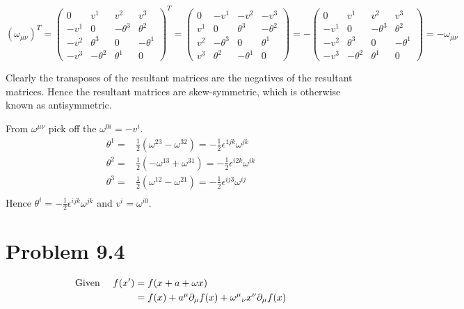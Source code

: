 \documentclass{article}
\begin{document}
\[(\omega_{\mu\nu})^T=\begin{pmatrix}0&v^1&v^2&v^3\\-v^1&0&-\theta^3&\theta^2\\-v^2&\theta^3&0&-\theta^1\\-v^3&-\theta^2&\theta^1&0\end{pmatrix}^T=\begin{pmatrix}0&-v^1&-v^2&-v^3\\v^1&0&\theta^3&-\theta^2\\v^2&-\theta^3&0&\theta^1\\v^3&\theta^2&-\theta^1&0\end{pmatrix}=-\begin{pmatrix}0&v^1&v^2&v^3\\-v^1&0&-\theta^3&\theta^2\\-v^2&\theta^3&0&-\theta^1\\-v^3&-\theta^2&\theta^1&0\end{pmatrix}=-\omega_{\mu\nu}\]

Clearly the transposes of the resultant matrices are the negatives of the resultant matrices. Hence the resultant matrices are skew-symmetric, which is otherwise known as antisymmetric. 

From $\omega^{\mu\nu}$ pick off the $\omega^{0i}=-v^i$.
\begin{align*}
	\theta^1= & \frac{1}{2}(\omega^{23}-\omega^{32})=-\frac{1}{2}\epsilon^{1jk}\omega^{jk}  \\
	\theta^2= & \frac{1}{2}(-\omega^{13}+\omega^{31})=-\frac{1}{2}\epsilon^{i2k}\omega^{ik} \\
	\theta^3= & \frac{1}{2}(\omega^{12}-\omega^{21})=-\frac{1}{2}\epsilon^{ij3}\omega^{ij}  \\
\end{align*}
Hence $\theta^i=-\frac{1}{2}\epsilon^{ijk}\omega^{jk}$ and $v^i=\omega^{i0}$.





\section*{Problem 9.4}

\begin{align*}
	\qq*{Given } f(x^\prime) & = f(x+a+\omega x)                                                       \\
	                         & = f(x)+a^\mu \partial_\mu f(x)+{\omega^\mu}_\nu x^\nu \partial_\mu f(x)
\end{align*}
\end{document}
